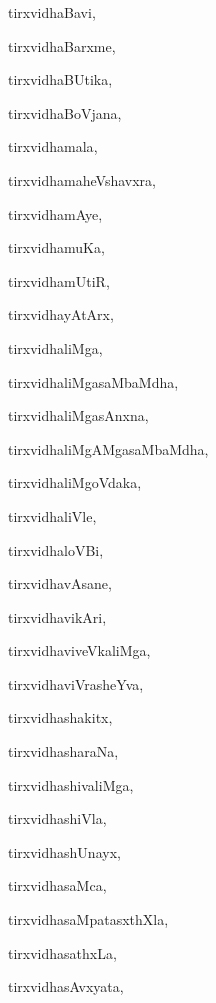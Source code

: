 \begin{multicols}{2}
{tirxvidhaBavi}, \pageref{tirxvidhaBavi}

{tirxvidhaBarxme}, \pageref{tirxvidhaBarxme}

{tirxvidhaBUtika}, \pageref{tirxvidhaBUtika}

{tirxvidhaBoVjana}, \pageref{tirxvidhaBoVjana}

{tirxvidhamala}, \pageref{tirxvidhamala}

{tirxvidhamaheVshavxra}, \pageref{tirxvidhamaheVshavxra}

{tirxvidhamAye}, \pageref{tirxvidhamAye}

{tirxvidhamuKa}, \pageref{tirxvidhamuKa}

{tirxvidhamUtiR}, \pageref{tirxvidhamUtiR}

{tirxvidhayAtArx}, \pageref{tirxvidhayAtArx}

{tirxvidhaliMga}, \pageref{tirxvidhaliMga}

{tirxvidhaliMgasaMbaMdha}, \pageref{tirxvidhaliMgasaMbaMdha}

{tirxvidhaliMgasAnxna}, \pageref{tirxvidhaliMgasAnxna}

{tirxvidhaliMgAMgasaMbaMdha}, \pageref{tirxvidhaliMgAMgasaMbaMdha}

{tirxvidhaliMgoVdaka}, \pageref{tirxvidhaliMgoVdaka}

{tirxvidhaliVle}, \pageref{tirxvidhaliVle}

{tirxvidhaloVBi}, \pageref{tirxvidhaloVBi}

{tirxvidhavAsane}, \pageref{tirxvidhavAsane}

{tirxvidhavikAri}, \pageref{tirxvidhavikAri}

{tirxvidhaviveVkaliMga}, \pageref{tirxvidhaviveVkaliMga}

{tirxvidhaviVrasheYva}, \pageref{tirxvidhaviVrasheYva}

{tirxvidhashakitx}, \pageref{tirxvidhashakitx}

{tirxvidhasharaNa}, \pageref{tirxvidhasharaNa}

{tirxvidhashivaliMga}, \pageref{tirxvidhashivaliMga}

{tirxvidhashiVla}, \pageref{tirxvidhashiVla}

{tirxvidhashUnayx}, \pageref{tirxvidhashUnayx}

{tirxvidhasaMca}, \pageref{tirxvidhasaMca}

{tirxvidhasaMpatasxthXla}, \pageref{tirxvidhasaMpatasxthXla}

{tirxvidhasathxLa}, \pageref{tirxvidhasathxLa}

{tirxvidhasAvxyata}, \pageref{tirxvidhasAvxyata}


\end{multicols}
